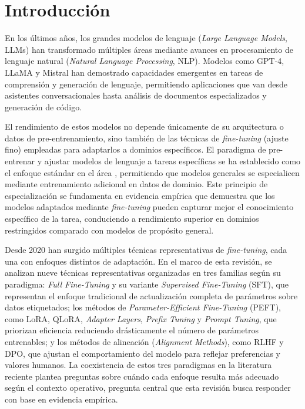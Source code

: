\chapter{Introducción}

En los últimos años, los grandes modelos de lenguaje (\textit{Large Language Models}, LLMs) han transformado múltiples áreas mediante avances en procesamiento de lenguaje natural (\textit{Natural Language Processing}, NLP). Modelos como GPT-4, LLaMA y Mistral han demostrado capacidades emergentes en tareas de comprensión y generación de lenguaje, permitiendo aplicaciones que van desde asistentes conversacionales hasta análisis de documentos especializados y generación de código.

El rendimiento de estos modelos no depende únicamente de su arquitectura o datos de pre-entrenamiento, sino también de las técnicas de \textit{fine-tuning} (ajuste fino) empleadas para adaptarlos a dominios específicos. El paradigma de pre-entrenar y ajustar modelos de lenguaje a tareas específicas se ha establecido como el enfoque estándar en el área \parencite[p.~220]{Ding2023}, permitiendo que modelos generales se especialicen mediante entrenamiento adicional en datos de dominio. Este principio de especialización se fundamenta en evidencia empírica que demuestra que los modelos adaptados mediante \textit{fine-tuning} pueden capturar mejor el conocimiento específico de la tarea, conduciendo a rendimiento superior en dominios restringidos comparado con modelos de propósito general.

Desde 2020 han surgido múltiples técnicas representativas de \textit{fine-tuning}, cada una con enfoques distintos de adaptación. En el marco de esta revisión, se analizan nueve técnicas representativas organizadas en tres familias según su paradigma: \textit{Full Fine-Tuning} y su variante \textit{Supervised Fine-Tuning} (SFT), que representan el enfoque tradicional de actualización completa de parámetros sobre datos etiquetados; los métodos de \textit{Parameter-Efficient Fine-Tuning} (PEFT), como LoRA, QLoRA, \textit{Adapter Layers}, \textit{Prefix Tuning} y \textit{Prompt Tuning}, que priorizan eficiencia reduciendo drásticamente el número de parámetros entrenables; y los métodos de alineación (\textit{Alignment Methods}), como RLHF y DPO, que ajustan el comportamiento del modelo para reflejar preferencias y valores humanos. La coexistencia de estos tres paradigmas en la literatura reciente plantea preguntas sobre cuándo cada enfoque resulta más adecuado según el contexto operativo, pregunta central que esta revisión busca responder con base en evidencia empírica.


